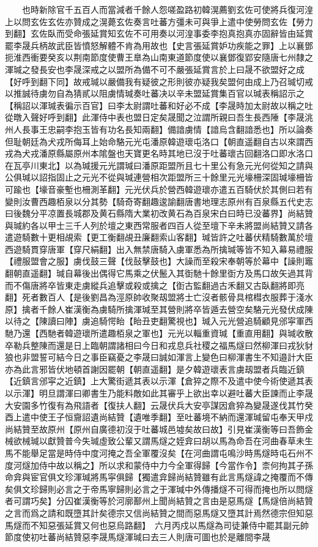 　　也時新除官千五百人而當減者千餘人怨嗟盈路初韓滉薦劉玄佐可使將兵復河湟上以問玄佐玄佐亦贊成之滉薨玄佐奏言吐蕃方彊未可與爭上遣中使勞問玄佐【勞力到翻】玄佐臥而受命張延賞知玄佐不可用奏以河湟事委李抱真抱真亦固辭皆由延賞罷李晟兵柄故武臣皆憤怒解體不肯為用故也【史言張延賞妒功疾能之罪】上以襄鄧扼淮西衝要癸亥以荆南節度使曹王臯為山南東道節度使以襄鄧復郢安隨唐七州隸之　渾瑊之發長安也李晟深戒之以盟所為備不可不嚴張延賞言於上曰晟不欲盟好之成【好呼到翻下同】故戒瑊以嚴備我有疑彼之形則彼亦疑我矣盟何由成上乃召瑊切戒以推誠待虜勿自為猜貳以阻虜情瑊奏吐蕃决以辛未盟延賞集百官以瑊表稱詔示之【稱詔以渾瑊表徧示百官】曰李太尉謂吐蕃和好必不成【李晟時加太尉故以稱之吐從暾入聲好呼到翻】此渾侍中表也盟日定矣晟聞之泣謂所親曰吾生長西陲【李晟洮州人長事王忠嗣李抱玉皆有功名長知兩翻】備諳虜情【諳烏含翻諳悉也】所以論奏但耻朝廷為犬戎所侮耳上始命駱元光屯潘原韓遊瓌屯洛口【朝直遥翻自古以來謂西戎為犬戎潘原縣屬原州本隂盤也天寶更名時其地已沒于吐蕃瓌古回翻洛口即水洛口在瓦亭川東北】以為瑊援元光謂瑊曰潘原距盟所且七十里公有急元光何從知之請與公俱瑊以詔指固止之元光不從與瑊連營相次距盟所三十餘里元光壕柵深固瑊壕柵皆可踰也【壕音豪塹也柵測革翻】元光伏兵於營西韓遊瓌亦遣五百騎伏於其側曰若有變則汝曹西趣栢泉以分其勢【騎奇寄翻趣逡諭翻唐書地理志原州有百泉縣五代史志曰後魏分平凉置長城郡及黄石縣隋大業初改黄石為百泉宋白曰時已没蕃界】尚結贊與瑊約各以甲士三千人列於壇之東西常服者四百人從至壇下辛未將盟尚結贊又請各遣遊騎數十更相覘索【更工衡翻覘丑廉翻索山客翻】瑊皆許之吐蕃伏精騎數萬於壇西遊騎貫穿唐軍【穿尺絹翻】出入無禁唐騎入虜軍悉為所擒瑊等皆不知入幕易禮服【禮服盟會之服】虜伐鼓三聲【伐鼔擊鼓也】大譟而至殺宋奉朝等於幕中【譟則竈翻朝直遥翻】瑊自幕後出偶得它馬乘之伏鬛入其衘馳十餘里衘方及馬口故矢過其背而不傷唐將卒皆東走虜縱兵追擊或殺或擒之【衘古監翻過古禾翻又古臥翻將即亮翻】死者數百人【是後劉昌為涇原帥收聚刼盟將士亡沒者骸骨具棺槥衣服葬于淺水原】擒者千餘人崔漢衡為虜騎所擒渾瑊至其營則將卒皆遁去營空矣駱元光發伏成陳以待之【陳讀曰陣】虜追騎愕眙【眙丑吏翻驚視也】瑊入元光營追騎顧見邠寜軍西馳乃還【西馳者韓遊瓌所遣趣栢泉之軍也】元光以輜重資瑊【重直用翻】與瑊收散卒勒兵整陳而還是日上臨朝謂諸相曰今日和戎息兵社稷之福馬燧曰然柳渾曰戎狄豺狼也非盟誓可結今日之事臣竊憂之李晟曰誠如渾言上變色曰柳渾書生不知邉計大臣亦為此言邪皆伏地頓首謝因罷朝【朝直遥翻】是夕韓遊瓌表言虜刼盟者兵臨近鎮【近鎮言邠寜之近鎮】上大驚街遞其表以示渾【倉猝之際不及遣中使今術使遞其表以示渾】明旦謂渾曰卿書生乃能料敵如此其審乎上欲出幸以避吐蕃大臣諫而止李晟大安園多竹復有為飛語者【復扶人翻】云晟伏兵大安亭謀因倉猝為變晟遂伐其竹癸酉上遣中使王子恒齎詔遺尚結贊【遺唯季翻】至吐蕃境不納而還渾瑊留屯奉天甲戍尚結贊至故原州【原州自廣德初沒于吐蕃城邑墟矣故曰故】引見崔漢衡等曰吾飾金械欲械瑊以獻贊普今失瑊虛致公輩又謂馬燧之姪弇曰胡以馬為命吾在河曲春草未生馬不能舉足當是時侍中度河掩之吾全軍覆沒矣【在河曲謂屯鳴沙時馬燧時屯石州不度河燧加侍中故以稱之】所以求和蒙侍中力今全軍得歸【今當作令】柰何拘其子孫命弇與宦官俱文珍渾瑊將馬寜俱歸【獨遣弇歸尚結贊雖有此言馬燧諱之掩覆而不傳矣俱文珍歸則必言之于帝馬寧歸則必言之于渾瑊中外傳播燧不可得而掩也所以問燧者可謂巧矣】分囚崔漢衡等於河廓鄯州上聞尚結贊之言由是惡馬燧【馬燧倍尚結贊之言而爲之請和既墮其計矣德宗又信尚結贊之間而惡馬燧又墮其計焉然德宗但知惡馬燧而不知惡張延賞又何也惡烏路翻】　六月丙戍以馬燧為司徒兼侍中罷其副元帥節度使初吐蕃尚結贊惡李晟馬燧渾瑊曰去三人則唐可圖也於是離間李晟